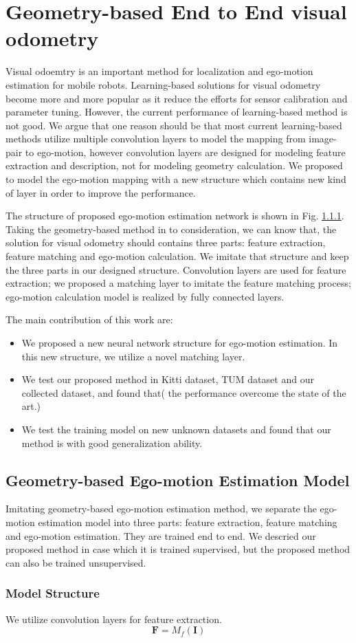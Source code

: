 \chapter{Geometry-based End to End visual odometry}
Visual odoemtry is an important method for localization and ego-motion estimation for mobile robots. Learning-based solutions for visual odometry become more and more popular as it reduce the efforts for sensor calibration and parameter tuning. However, the current performance of learning-based method is not good. We argue that one reason should be that most current learning-based methods utilize multiple  convolution layers to model the mapping from image-pair to ego-motion, however convolution layers are designed for modeling feature extraction and description, not for modeling geometry calculation. We proposed to model the ego-motion mapping with a new structure which contains new kind of layer in order to improve the performance. 

The structure of proposed ego-motion estimation network is shown in Fig. \ref{}. Taking the geometry-based method in to consideration, we can know that, the solution for visual odometry should contains three parts: feature extraction, feature matching and ego-motion calculation. We imitate that structure and keep the three parts in our designed structure. Convolution layers are used for feature extraction; we proposed a matching layer to imitate the feature matching process; ego-motion calculation model is realized by fully connected layers.

The main contribution of this work are: 
\begin{itemize}

\item We proposed a new neural network structure for ego-motion estimation. In this new structure, we utilize a novel matching layer. 

\item We test our proposed method in Kitti dataset, TUM dataset and our collected dataset, and found that( the performance overcome the state of the art.)

\item We test the training model on new unknown datasets  and found that our method is with good generalization ability. 
\end{itemize}

\section{Geometry-based Ego-motion Estimation Model}
Imitating geometry-based ego-motion estimation method, we separate the ego-motion estimation model into three parts: feature extraction, feature matching and ego-motion estimation. They are trained end to end. We descried our proposed method in case which it is trained supervised, but the proposed method can also be trained unsupervised. 

\subsection{Model Structure}
We utilize convolution layers for feature extraction.
\begin{equation}
    \mathbf{F} =M_f \left( \mathbf{I}\right)
\end{equation}